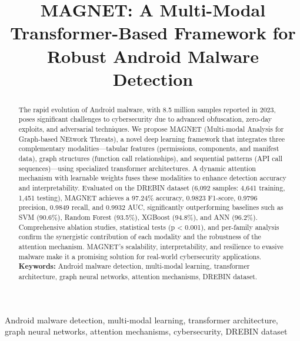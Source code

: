 \documentclass[10pt,conference]{IEEEtran}
\begin{document}
\title{MAGNET: A Multi-Modal Transformer-Based Framework for Robust Android Malware Detection}

\author{
}

\maketitle

\begin{abstract}
The rapid evolution of Android malware, with 8.5 million samples reported in 2023, poses significant challenges to cybersecurity due to advanced obfuscation, zero-day exploits, and adversarial techniques. We propose MAGNET (Multi-modal Analysis for Graph-based NEtwork Threats), a novel deep learning framework that integrates three complementary modalities—tabular features (permissions, components, and manifest data), graph structures (function call relationships), and sequential patterns (API call sequences)—using specialized transformer architectures. A dynamic attention mechanism with learnable weights fuses these modalities to enhance detection accuracy and interpretability. Evaluated on the DREBIN dataset (6,092 samples: 4,641 training, 1,451 testing), MAGNET achieves a 97.24\% accuracy, 0.9823 F1-score, 0.9796 precision, 0.9849 recall, and 0.9932 AUC, significantly outperforming baselines such as SVM (90.6\%), Random Forest (93.5\%), XGBoost (94.8\%), and ANN (96.2\%). Comprehensive ablation studies, statistical tests (p < 0.001), and per-family analysis confirm the synergistic contribution of each modality and the robustness of the attention mechanism. MAGNET's scalability, interpretability, and resilience to evasive malware make it a promising solution for real-world cybersecurity applications. \textbf{Keywords:} Android malware detection, multi-modal learning, transformer architecture, graph neural networks, attention mechanisms, DREBIN dataset.
\end{abstract}

\begin{IEEEkeywords}
Android malware detection, multi-modal learning, transformer architecture, graph neural networks, attention mechanisms, cybersecurity, DREBIN dataset
\end{IEEEkeywords}
\end{document}

